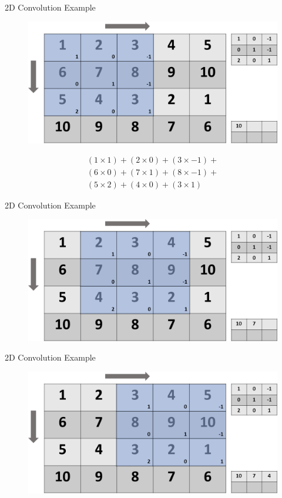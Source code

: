 \begin{frame}{2D Convolution Example}
	\begin{figure}
		\includegraphics[width=.7\textwidth, center]{figures/conv-slide2-cropped}
	\end{figure}
	\begin{align*}
		(1\times 1)+(2\times 0)+(3\times-1)+ \\
	(6\times 0) + (7 \times 1) + (8 \times -1)+ \\
	(5\times 2) + (4\times 0) + (3\times 1)  
	\end{align*}

\end{frame}

\begin{frame}{2D Convolution Example}
	\begin{figure}
		\includegraphics[width=.7\textwidth, center]{figures/conv-slide3-cropped}
	\end{figure}
\end{frame}

\begin{frame}{2D Convolution Example}
	\begin{figure}
		\includegraphics[width=.7\textwidth, center]{figures/conv-slide4-cropped}
	\end{figure}
\end{frame}

